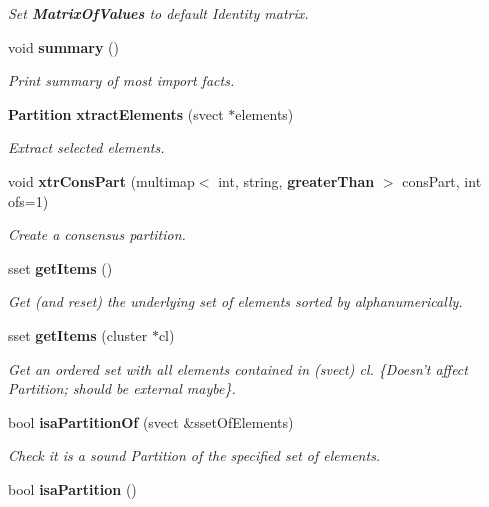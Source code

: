 \begin{CompactItemize}
\begin{CompactList}\small\item\em Set {\bf Matrix\-Of\-Values} to default Identity matrix. \item\end{CompactList}\item 
void {\bf summary} ()\label{classPartition_a6}

\begin{CompactList}\small\item\em Print summary of most import facts. \item\end{CompactList}\item 
{\bf Partition} {\bf xtract\-Elements} (svect $\ast$elements)\label{classPartition_a7}

\begin{CompactList}\small\item\em Extract selected elements. \item\end{CompactList}\item 
void {\bf xtr\-Cons\-Part} (multimap$<$ int, string, {\bf greater\-Than} $>$ cons\-Part, int ofs=1)\label{classPartition_a8}

\begin{CompactList}\small\item\em Create a consensus partition. \item\end{CompactList}\item 
sset {\bf get\-Items} ()\label{classPartition_a9}

\begin{CompactList}\small\item\em Get (and reset) the underlying set of elements sorted by alphanumerically. \item\end{CompactList}\item 
sset {\bf get\-Items} (cluster $\ast$cl)\label{classPartition_a10}

\begin{CompactList}\small\item\em Get an ordered set with all elements contained in (svect) cl. \{Doesn't affect Partition; should be external maybe\}. \item\end{CompactList}\item 
bool {\bf isa\-Partition\-Of} (svect \&sset\-Of\-Elements)
\begin{CompactList}\small\item\em Check it is a sound Partition of the specified set of elements. \item\end{CompactList}\item 
bool {\bf isa\-Partition} ()\label{classPartition_a12}


\end{CompactItemize}
